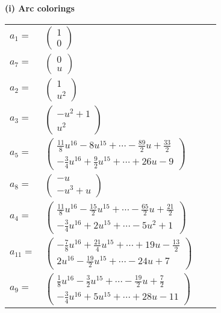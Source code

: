 \documentclass[1p]{elsarticle_modified}
\theoremstyle{definition}
\begin{document}
\flushleft \textbf{(i) Arc colorings}\\
\begin{tabular}{m{7pt} m{180pt} m{7pt} m{180pt} }
\flushright $a_{1}=$&$\begin{pmatrix}1\\0\end{pmatrix}$ \\
\flushright $a_{7}=$&$\begin{pmatrix}0\\u\end{pmatrix}$ \\
\flushright $a_{2}=$&$\begin{pmatrix}1\\u^2\end{pmatrix}$ \\
\flushright $a_{3}=$&$\begin{pmatrix}- u^2+1\\u^2\end{pmatrix}$ \\
\flushright $a_{5}=$&$\begin{pmatrix}\frac{11}{8} u^{16}-8 u^{15}+\cdots-\frac{89}{2} u+\frac{33}{2}\\-\frac{3}{4} u^{16}+\frac{9}{2} u^{15}+\cdots+26 u-9\end{pmatrix}$ \\
\flushright $a_{8}=$&$\begin{pmatrix}- u\\- u^3+u\end{pmatrix}$ \\
\flushright $a_{4}=$&$\begin{pmatrix}\frac{11}{8} u^{16}-\frac{15}{2} u^{15}+\cdots-\frac{65}{2} u+\frac{21}{2}\\-\frac{3}{4} u^{16}+2 u^{15}+\cdots-5 u^2+1\end{pmatrix}$ \\
\flushright $a_{11}=$&$\begin{pmatrix}-\frac{7}{8} u^{16}+\frac{21}{4} u^{15}+\cdots+19 u-\frac{13}{2}\\2 u^{16}-\frac{19}{2} u^{15}+\cdots-24 u+7\end{pmatrix}$ \\
\flushright $a_{9}=$&$\begin{pmatrix}\frac{1}{8} u^{16}-\frac{3}{2} u^{15}+\cdots-\frac{19}{2} u+\frac{7}{2}\\-\frac{3}{4} u^{16}+5 u^{15}+\cdots+28 u-11\end{pmatrix}$ \\

\end{tabular}
\end{document}

